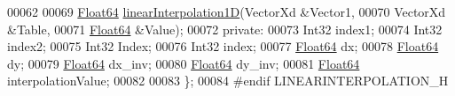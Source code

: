 \begin{DoxyCode}
00062 
00069     \hyperlink{group___tools_ga3f1431cb9f76da10f59246d1d743dc2c}{Float64} \hyperlink{class_linear_interpolation_aee1cf48d321cf6708470d9119fbf79e4}{linearInterpolation1D}(VectorXd &Vector1,
00070                                 VectorXd &Table,
00071                                 \hyperlink{group___tools_ga3f1431cb9f76da10f59246d1d743dc2c}{Float64} &Value);
00072 \textcolor{keyword}{private}:
00073     Int32       index1;
00074     Int32       index2;
00075     Int32       Index;
00076     Int32       index;
00077     \hyperlink{group___tools_ga3f1431cb9f76da10f59246d1d743dc2c}{Float64}     dx;
00078     \hyperlink{group___tools_ga3f1431cb9f76da10f59246d1d743dc2c}{Float64}      dy;
00079     \hyperlink{group___tools_ga3f1431cb9f76da10f59246d1d743dc2c}{Float64}     dx\_inv;
00080     \hyperlink{group___tools_ga3f1431cb9f76da10f59246d1d743dc2c}{Float64}      dy\_inv;
00081     \hyperlink{group___tools_ga3f1431cb9f76da10f59246d1d743dc2c}{Float64}      interpolationValue;
00082 
00083 \};
00084 \textcolor{preprocessor}{#endif LINEARINTERPOLATION\_H}
\end{DoxyCode}
